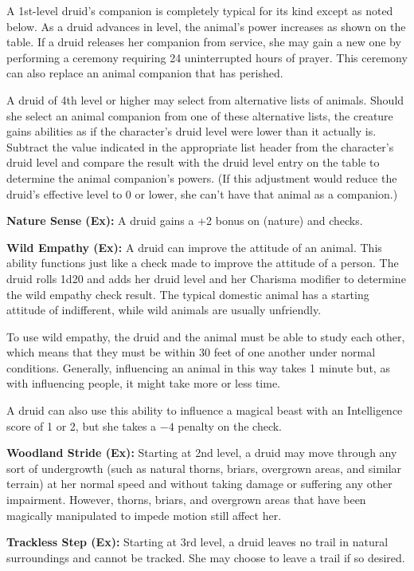 A 1st-level druid's companion is completely typical for its kind except as noted below. As a druid advances in level, the animal's power increases as shown on the table. If a druid releases her companion from service, she may gain a new one by performing a ceremony requiring 24 uninterrupted hours of prayer. This ceremony can also replace an animal companion that has perished.

A druid of 4th level or higher may select from alternative lists of animals. Should she select an animal companion from one of these alternative lists, the creature gains abilities as if the character's druid level were lower than it actually is. Subtract the value indicated in the appropriate list header from the character's druid level and compare the result with the druid level entry on the table to determine the animal companion's powers. (If this adjustment would reduce the druid's effective level to 0 or lower, she can't have that animal as a companion.)

\textbf{Nature Sense (Ex):} A druid gains a +2 bonus on  (nature) and  checks.

\textbf{Wild Empathy (Ex):} A druid can improve the attitude of an animal. This ability functions just like a  check made to improve the attitude of a person. The druid rolls 1d20 and adds her druid level and her Charisma modifier to determine the wild empathy check result. The typical domestic animal has a starting attitude of indifferent, while wild animals are usually unfriendly.

To use wild empathy, the druid and the animal must be able to study each other, which means that they must be within 30 feet of one another under normal conditions. Generally, influencing an animal in this way takes 1 minute but, as with influencing people, it might take more or less time.

A druid can also use this ability to influence a magical beast with an Intelligence score of 1 or 2, but she takes a $-4$ penalty on the check.

\textbf{Woodland Stride (Ex):} Starting at 2nd level, a druid may move through any sort of undergrowth (such as natural thorns, briars, overgrown areas, and similar terrain) at her normal speed and without taking damage or suffering any other impairment. However, thorns, briars, and overgrown areas that have been magically manipulated to impede motion still affect her.

\textbf{Trackless Step (Ex):} Starting at 3rd level, a druid leaves no trail in natural surroundings and cannot be tracked. She may choose to leave a trail if so desired.


